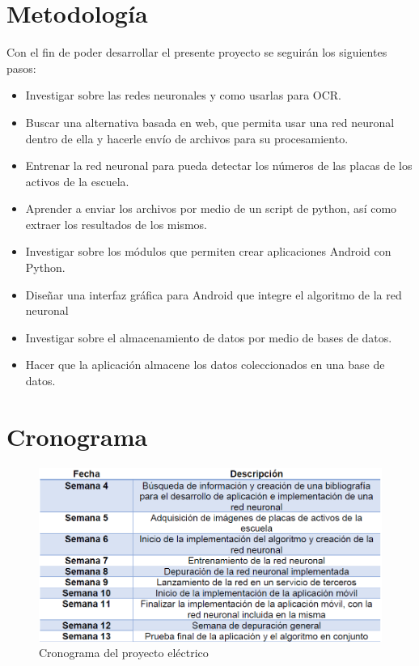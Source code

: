 \section{Metodología}
Con el fin de poder desarrollar el presente proyecto se seguirán los siguientes pasos:
\begin{itemize}
    \item Investigar sobre las redes neuronales y como usarlas para OCR.
    \item Buscar una alternativa basada en web, que permita usar una red neuronal dentro de ella y hacerle envío de archivos para su procesamiento.
    \item Entrenar la red neuronal para pueda detectar los números de las placas de los activos de la escuela.
    \item Aprender a enviar los archivos por medio de un script de python, así como extraer los resultados de los mismos.
    \item Investigar sobre los módulos que permiten crear aplicaciones Android con Python.
    \item Diseñar una interfaz gráfica para Android que integre el algoritmo de la red neuronal
    \item Investigar sobre el almacenamiento de datos por medio de bases de datos.
    \item Hacer que la aplicación almacene los datos coleccionados en una base de datos.
    
\end{itemize}

\section{Cronograma}
\begin{figure}[H]
\centering
\includegraphics[width=\textwidth]{imagenes/Cronograma.png} 
\caption{Cronograma del proyecto eléctrico}
\label{F:crono}
\end{figure}
